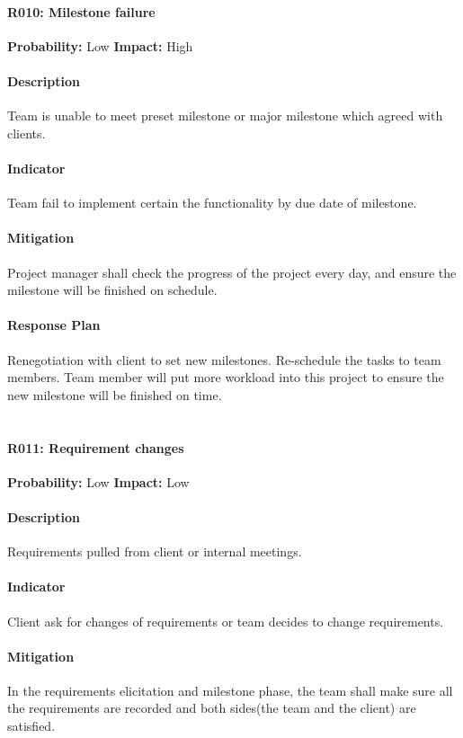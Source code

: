 \documentclass[11pt, a4paper]{report}
\begin{document}
	\paragraph{R010: Milestone failure} \hspace{1cm} \textbf{Probability: }Low\hspace{1cm}   \textbf{Impact: }High
	\paragraph{Description}Team is unable to meet preset milestone or major milestone which agreed with clients.
	\paragraph{Indicator}Team fail to implement certain the functionality by due date of milestone. 
	\paragraph{Mitigation}Project manager shall check the progress of the project every day, and ensure the milestone will be finished on schedule. 
	\paragraph{Response Plan}Renegotiation with client to set new milestones. Re-schedule the tasks to team members. Team member will put more workload into this project to ensure the new milestone will be finished on time.\\\\

\pagebreak

	\paragraph{R011: Requirement changes} \hspace{1cm} \textbf{Probability: }Low\hspace{1cm}   \textbf{Impact: }Low
	\paragraph{Description}Requirements pulled from client or internal meetings.
	\paragraph{Indicator}Client ask for changes of requirements or team decides to change requirements.  
	\paragraph{Mitigation}In the requirements elicitation and milestone phase, the team shall make sure all the requirements are recorded and both sides(the team and the client) are satisfied.
\end{document}
